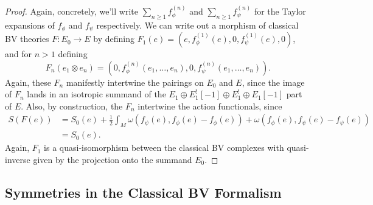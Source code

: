 \documentclass[10pt, oneside]{article}
\begin{document}
\begin{proof}
Again, concretely, we'll write $\sum_{n \ge 1} f^{(n)}_\phi$ and $\sum_{n \ge 1} f^{(n)}_{\psi}$ for the Taylor expansions of $f_\phi$ and $f_{\psi}$ respectively.  We can write out a morphism of classical BV theories $F \colon E_0 \to E$ by defining $F_1(e) = (e, f^{(1)}_{\phi}(e),0,f^{(1)}_\psi(e),0)$, and for $n > 1$ defining 
\[F_n(e_1\otimes e_n) = (0, f^{(n)}_{\phi}(e_1, \ldots, e_n), 0, f^{(n)}_{\psi}(e_1, \ldots, e_n)).\]
Again, these $F_n$ manifestly intertwine the pairings on $E_0$ and $E$, since the image of $F_n$ lands in an isotropic summand of the $E_1\oplus E_1^![-1]\oplus E_1^!\oplus E_1[-1]$ part of $E$.  Also, by construction, the $F_n$ intertwine the action functionals, since
\begin{align*}
S(F(e)) &= S_0(e) + \frac{1}{2} \int_M \omega(f_\psi(e), f_\phi(e) - f_\phi(e)) + \omega(f_\phi(e), f_\psi(e) - f_\psi(e)) \\
&= S_0(e).
\end{align*}
Again, $F_1$ is a quasi-isomorphism between the classical BV complexes with quasi-inverse given by the projection onto the summand $E_0$.
\end{proof}

\subsection{Symmetries in the Classical BV Formalism} \label{symmetry_section}
\end{document}
